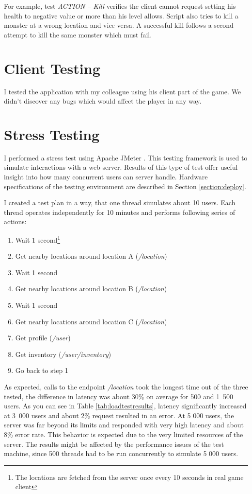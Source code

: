 For example, test \textit{ACTION -- Kill} verifies the client cannot request setting his health to negative value or more than his level allows. Script also tries to kill a monster at a wrong location and vice versa. A successful kill follows a second attempt to kill the same monster which must fail. 


\section{Client Testing}
I tested the application with my colleague using his client part of the game. We didn't discover any bugs which would affect the player in any way.

\section{Stress Testing}
I performed a stress test using Apache JMeter \cite{jmeter}. This testing framework is used to simulate interactions with a web server. Results of this type of test offer useful insight into how many concurrent users can server handle. Hardware specifications of the testing environment are described in Section \ref{section:deploy}.

I created a test plan in a way, that one thread simulates about 10 users. Each thread operates independently for 10 minutes and performs following series of actions:
\begin{enumerate}
	\item Wait 1 second\footnote{The locations are fetched from the server once every 10 seconds in real game client}
	\item Get nearby locations around location A (\textit{/location})
	\item Wait 1 second
	\item Get nearby locations around location B (\textit{/location})
	\item Wait 1 second
	\item Get nearby locations around location C (\textit{/location})
	\item Get profile (\textit{/user})
	\item Get inventory (\textit{/user/inventory})
	\item Go back to step 1
\end{enumerate}

As expected, calls to the endpoint \textit{/location} took the longest time out of the three tested, the difference in latency was about 30\% on average for 500 and 1~500 users. As you can see in Table \ref{tab:loadtestresults}, latency significantly increased at 3~000 users and about 2\% request resulted in an error. At 5 000 users, the server was far beyond its limits and responded with very high latency and about 8\% error rate. This behavior is expected due to the very limited resources of the server. The results might be affected by the performance issues of the test machine, since 500 threads had to be run concurrently to simulate 5 000 users.

